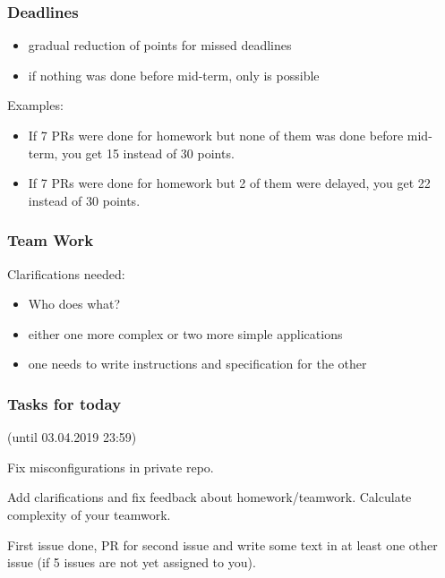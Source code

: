 \begin{frame}
	\frametitle{Deadlines}

	\begin{itemize}
	\item gradual reduction of points for missed deadlines
	\item if nothing was done before mid-term, only  is possible
	\end{itemize}
	Examples:

	\begin{itemize}
	\item If 7 PRs were done for homework but none of them was done before mid-term, you get 15 instead of 30 points.
	\item If 7 PRs were done for homework but 2 of them were delayed, you get 22 instead of 30 points.
	\end{itemize}
\end{frame}

\begin{frame}
	\frametitle{Team Work}


	Clarifications needed:
	\begin{itemize}
	\item Who does what?
	\item either one more complex or two more simple applications
	\item one needs to write instructions and specification for the other
	\end{itemize}
\end{frame}

\begin{assignment}
	\frametitle{Tasks for today}
	(until 03.04.2019 23:59)

	\begin{task}
	Fix misconfigurations in private repo.
	\end{task}
	\pause

	\begin{task}
	Add clarifications and fix feedback about homework/teamwork.
	Calculate complexity of your teamwork.
	\end{task}
	\pause

	\begin{task}
	First issue done, PR for second issue and write some text in at least one other issue (if 5 issues are not yet assigned to you).
	\end{task}
\end{assignment}

